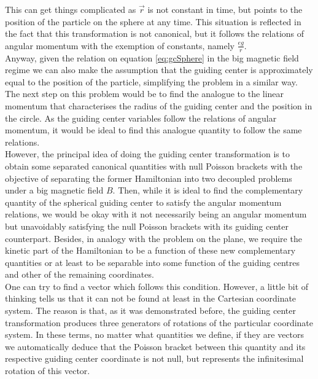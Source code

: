 This can get things complicated as $\vec{r}$ is not constant in time, but points to the position of the particle on the sphere at any time. This situation is reflected in the fact that this transformation is not canonical, but it follows the relations of angular momentum with the exemption of constants, namely $\frac{eg}{r}$.\\

Anyway, given the relation on equation \eqref{eq:gcSphere} in the big magnetic field regime we can also make the assumption that the guiding center is approximately equal to the position of the particle, simplifying the problem in a similar way. The next step on this problem would be to find the analogue to the linear momentum that characterises the radius of the guiding center and the position in the circle. As the guiding center variables follow the relations of angular momentum, it would be ideal to find this analogue quantity to follow the same relations.\\

However, the principal idea of doing the guiding center transformation is to obtain some separated canonical quantities with null Poisson brackets with the objective of separating the former Hamiltonian into two decoupled problems under a big magnetic field $B$. Then, while it is ideal to find the complementary quantity of the spherical guiding center to satisfy the angular momentum relations, we would be okay with it not necessarily being an angular momentum but unavoidably satisfying the null Poisson brackets with its guiding center counterpart. Besides, in analogy with the problem on the plane, we require the kinetic part of the Hamiltonian to be a function of these new complementary quantities or at least to be separable into some function of the guiding centres and other of the remaining coordinates.\\

One can try to find a vector which follows this condition. However, a little bit of thinking tells us that it can not be found at least in the Cartesian coordinate system. The reason is that, as it was demonstrated before, the guiding center transformation produces three generators of rotations of the particular coordinate system. In these terms, no matter what quantities we define, if they are vectors we automatically deduce that the Poisson bracket between this quantity and its respective guiding center coordinate is not null, but represents the infinitesimal rotation of this vector.\\

